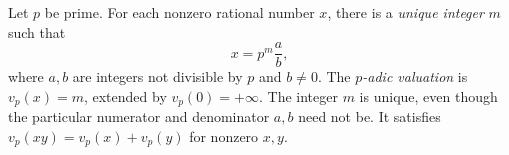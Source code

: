 
Let $p$ be prime. For each nonzero rational number $x$, there is a \emph{unique integer} $m$ such that
\[
x=p^m\frac ab,
\]
where $a,b$ are integers not divisible by $p$ and $b\ne0$. The \emph{$p$-adic valuation} is $v_p(x)=m$, extended by $v_p(0)=+\infty$. The integer $m$ is unique, even though the particular numerator and denominator $a,b$ need not be. It satisfies $v_p(xy)=v_p(x)+v_p(y)$ for nonzero $x,y$.
